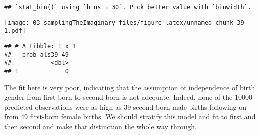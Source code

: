 \documentclass[
]{book}
\newenvironment{Shaded}{\begin{snugshade}}{\end{snugshade}}
\newcommand{\CommentTok}[1]{\textcolor[rgb]{0.56,0.35,0.01}{\textit{#1}}}
\newcommand{\DataTypeTok}[1]{\textcolor[rgb]{0.13,0.29,0.53}{#1}}
\newcommand{\DecValTok}[1]{\textcolor[rgb]{0.00,0.00,0.81}{#1}}
\newcommand{\KeywordTok}[1]{\textcolor[rgb]{0.13,0.29,0.53}{\textbf{#1}}}
\newcommand{\NormalTok}[1]{#1}
\newcommand{\OperatorTok}[1]{\textcolor[rgb]{0.81,0.36,0.00}{\textbf{#1}}}
\newcommand{\StringTok}[1]{\textcolor[rgb]{0.31,0.60,0.02}{#1}}
\begin{document}
\begin{verbatim}
## `stat_bin()` using `bins = 30`. Pick better value with `binwidth`.
\end{verbatim}

\texttt{[image: 03-samplingTheImaginary\_files/figure-latex/unnamed-chunk-39-1.pdf]}

\begin{Shaded}
\end{Shaded}

\begin{verbatim}
## # A tibble: 1 x 1
##   prob_als39_49
##           <dbl>
## 1             0
\end{verbatim}

The fit here is very poor, indicating that the assumption of independence of birth gender from first born to second born is not adequate. Indeed, none of the 10000 predicted observations were as high as 39 second-born male births following on from 49 first-born female births. We should stratify this model and fit to first and then second and make that distinction the whole way through.

  
\end{document}
